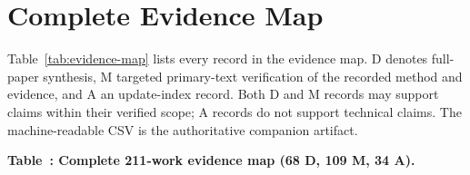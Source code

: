 \onecolumn
\section{Complete Evidence Map}
\label{app:evidence-map}
\small
Table~\ref{tab:evidence-map} lists every record in the evidence map. D denotes full-paper synthesis, M targeted primary-text verification of the recorded method and evidence, and A an update-index record. Both D and M records may support claims within their verified scope; A records do not support technical claims. The machine-readable CSV is the authoritative companion artifact.
\setlength{\LTleft}{0pt}
\setlength{\LTright}{0pt}
\label{tab:evidence-map}
\begin{center}\textbf{Table~\thetable: Complete 211-work evidence map (68 D, 109 M, 34 A).}\end{center}

